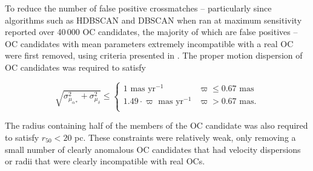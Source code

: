 To reduce the number of false positive crossmatches -- particularly since algorithms such as HDBSCAN and DBSCAN when ran at maximum sensitivity reported over 40$\,$000 OC candidates, the majority of which are false positives -- OC candidates with mean parameters extremely incompatible with a real OC were first removed, using criteria presented in \cite{cantat-gaudin_clusters_2020}. The proper motion dispersion of OC candidates was required to satisfy

\begin{equation}\label{c2:eqn:proper_motion}
\sqrt{\sigma_{\mu_{\alpha*}}^2+\sigma_{\mu_{\delta}}^2} \leq
  \begin{cases}
    1 \text{ mas yr}^{-1}                  & \varpi \leq 0.67 \text{ mas} \\
    1.49 \cdot \varpi \text{ mas yr}^{-1}  & \varpi >    0.67 \text{ mas.} \\
  \end{cases} 
\end{equation}

\noindent
The radius containing half of the members of the OC candidate was also required to satisfy $r_{50} < 20$ pc. These constraints were relatively weak, only removing a small number of clearly anomalous OC candidates that had velocity dispersions or radii that were clearly incompatible with real OCs.

